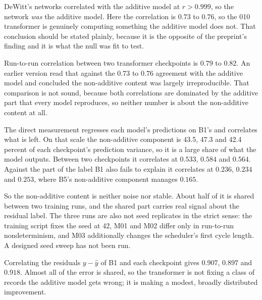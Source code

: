 
DeWitt's networks correlated with the additive model at $r > 0.999$, so the
network \emph{was} the additive model. Here the correlation is $0.73$ to $0.76$,
so the 010 transformer is genuinely computing something the additive model does
not. That conclusion should be stated plainly, because it is the opposite of the
preprint's finding and it is what the null was fit to test.

Run-to-run correlation between two transformer checkpoints is $0.79$ to $0.82$.
An earlier version read that against the $0.73$ to $0.76$ agreement with the
additive model and concluded the non-additive content was largely irreproducible.
That comparison is not sound, because both correlations are dominated by the
additive part that every model reproduces, so neither number is about the
non-additive content at all.

The direct measurement regresses each model's predictions on B1's and correlates
what is left. On that scale the non-additive component is 43.5, 47.3 and 42.4
percent of each checkpoint's prediction variance, so it is a large share of what
the model outputs. Between two checkpoints it correlates at $0.533$, $0.584$ and
$0.564$. Against the part of the label B1 also fails to explain it correlates at
$0.236$, $0.234$ and $0.253$, where B5's non-additive component manages $0.165$.

So the non-additive content is neither noise nor stable. About half of it is
shared between two training runs, and the shared part carries real signal about
the residual label. The three runs are also not seed replicates in the strict
sense: the training script fixes the seed at 42, M01 and M02 differ only in
run-to-run nondeterminism, and M03 additionally changes the scheduler's first
cycle length. A designed seed sweep has not been run.

Correlating the residuals $y - \hat{y}$ of B1 and each checkpoint gives $0.907$,
$0.897$ and $0.918$. Almost all of the error is shared, so the transformer is
not fixing a class of records the additive model gets wrong; it is making a
modest, broadly distributed improvement.

